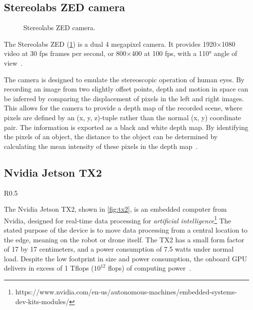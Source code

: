 \documentclass[\rootfolder/main.tex]{subfiles}
\begin{document}

\subsection{Stereolabs ZED camera}

\begin{figure}[h]
    \caption{Stereolabs ZED camera.}
    \label{fig:zed-camera}
\end{figure}

The Stereolabs ZED (\cref{fig:zed-camera}) is a dual 4 megapixel camera.
It provides 1920$\times$1080 video at 30 \acrfull{fps} frames per second, or 800$\times$400 at 100 \acrshort{fps}, with a \ang{110} angle of view~\cite{Stereolabs}.

The camera is designed to emulate the stereoscopic operation of human eyes.
By recording an image from two slightly offset points, depth and motion in space can be inferred by comparing the displacement of pixels in the left and right images.
This allows for the camera to provide a depth map of the recorded scene, where pixels are defined by an (x, y, z)-tuple rather than the normal (x, y) coordinate pair.
The information is exported as a black and white depth map.
By identifying the pixels of an object, the distance to the object can be determined by calculating the mean intensity of these pixels in the depth map~\cite{Stereolabs}.


\subsection{Nvidia Jetson TX2}

\begin{wrapfigure}{R}{0.5\columnwidth}
    \caption[Nvidia Jetson TX2 development kit.]{Nvidia Jetson TX2 development kit, image courtesy of Nvidia.}
    \label{fig:tx2}
\end{wrapfigure}

The Nvidia Jetson TX2, shown in \cref{fig:tx2}, is an embedded computer from Nvidia, designed for real-time data processing for \emph{artificial intelligence}\footnote{https://www.nvidia.com/en-us/autonomous-machines/embedded-systems-dev-kits-modules/}
The stated purpose of the device is to move data processing from a central location to the edge, meaning on the robot or drone itself.
The TX2 has a small form factor of 17 by 17 centimeters, and a power consumption of 7.5 watts under normal load.
Despite the low footprint in size and power consumption, the onboard GPU delivers in excess of 1 T\acrshort{flops} ($10^{12}$ \acrlong{flops}) of computing power~\cite{Nvidia2017}.
\end{document}
